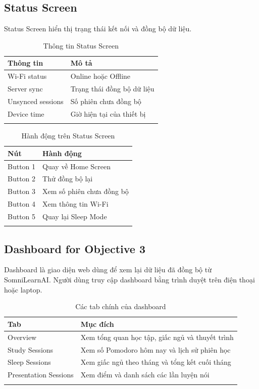 \documentclass[12pt,a4paper]{article}
\begin{document}
\subsection{Status Screen}

Status Screen hiển thị trạng thái kết nối và đồng bộ dữ liệu.

\begin{longtable}{|P{4cm}|P{10cm}|}
\hline
\textbf{Thông tin} & \textbf{Mô tả} \\
\hline
Wi-Fi status & Online hoặc Offline \\
\hline
Server sync & Trạng thái đồng bộ dữ liệu \\
\hline
Unsynced sessions & Số phiên chưa đồng bộ \\
\hline
Device time & Giờ hiện tại của thiết bị \\
\hline
\caption{Thông tin Status Screen}
\end{longtable}

\begin{longtable}{|P{3cm}|P{11.5cm}|}
\hline
\textbf{Nút} & \textbf{Hành động} \\
\hline
Button 1 & Quay về Home Screen \\
\hline
Button 2 & Thử đồng bộ lại \\
\hline
Button 3 & Xem số phiên chưa đồng bộ \\
\hline
Button 4 & Xem thông tin Wi-Fi \\
\hline
Button 5 & Quay lại Sleep Mode \\
\hline
\caption{Hành động trên Status Screen}
\end{longtable}

\subsection{Dashboard for Objective 3}

Dashboard là giao diện web dùng để xem lại dữ liệu đã đồng bộ từ SomniLearnAI. Người dùng truy cập dashboard bằng trình duyệt trên điện thoại hoặc laptop.

\begin{longtable}{|P{4cm}|P{10cm}|}
\hline
\textbf{Tab} & \textbf{Mục đích} \\
\hline
Overview & Xem tổng quan học tập, giấc ngủ và thuyết trình \\
\hline
Study Sessions & Xem số Pomodoro hôm nay và lịch sử phiên học \\
\hline
Sleep Sessions & Xem giấc ngủ theo tháng và tổng kết cuối tháng \\
\hline
Presentation Sessions & Xem điểm và danh sách các lần luyện nói \\
\hline
\caption{Các tab chính của dashboard}
\end{longtable}
\end{document}
